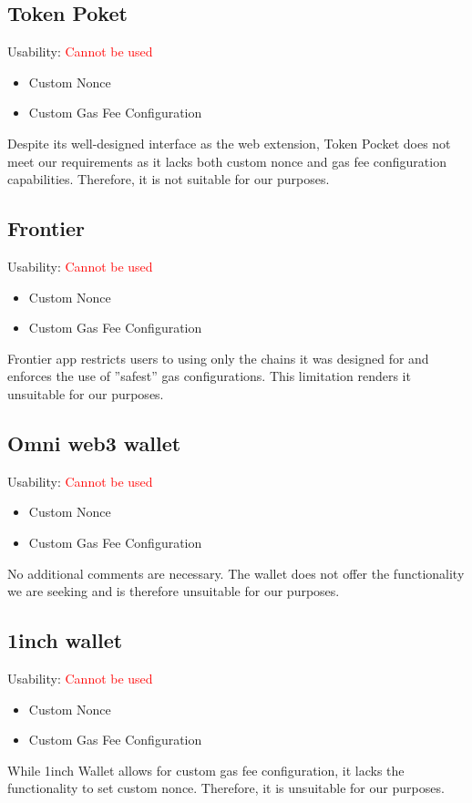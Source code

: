 \documentclass[fleqn,10pt]{olplainarticle}
\newcommand{\cmark}{\ding{51}}%
\newcommand{\xmark}{\ding{55}}%
\begin{document}
\subsection{Token Poket}
Usability: \textcolor{red}{Cannot be used}
\begin{itemize}[noitemsep, nolistsep]
	\item [\textcolor{red}{\xmark}] Custom Nonce
	\item [\textcolor{red}{\xmark}] Custom Gas Fee Configuration
\end{itemize}
Despite its well-designed interface as the web extension, Token Pocket does not meet our requirements as it lacks both custom nonce and gas fee configuration capabilities. Therefore, it is not suitable for our purposes.

\subsection{Frontier}
Usability: \textcolor{red}{Cannot be used}
\begin{itemize}[noitemsep, nolistsep]
	\item [\textcolor{red}{\xmark}] Custom Nonce
	\item [\textcolor{red}{\xmark}] Custom Gas Fee Configuration
\end{itemize}
Frontier app restricts users to using only the chains it was designed for and enforces the use of ''safest'' gas configurations. This limitation renders it unsuitable for our purposes.

\subsection{Omni web3 wallet}
Usability: \textcolor{red}{Cannot be used}
\begin{itemize}[noitemsep, nolistsep]
	\item [\textcolor{red}{\xmark}] Custom Nonce
	\item [\textcolor{red}{\xmark}] Custom Gas Fee Configuration
\end{itemize}
No additional comments are necessary. The wallet does not offer the functionality we are seeking and is therefore unsuitable for our purposes.

\subsection{1inch wallet}
Usability: \textcolor{red}{Cannot be used}
\begin{itemize}[noitemsep, nolistsep]
	\item [\textcolor{red}{\xmark}] Custom Nonce
	\item [\textcolor{green}{\cmark}] Custom Gas Fee Configuration
\end{itemize}
While 1inch Wallet allows for custom gas fee configuration, it lacks the functionality to set custom nonce. Therefore, it is unsuitable for our purposes.
\end{document}
